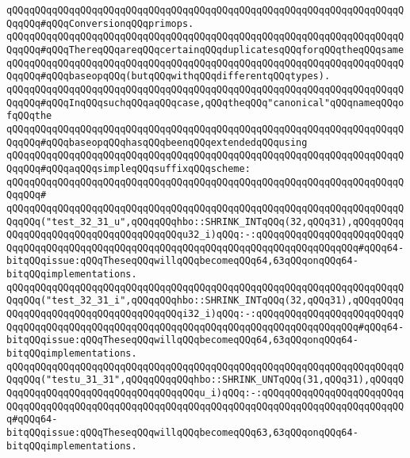 \newline
\verb|qQQqqQQqqQQqqQQqqQQqqQQqqQQqqQQqqQQqqQQqqQQqqQQqqQQqqQQqqQQqqQQqqQQqqQQqqQQq#qQQqConversionqQQqprimops.|\newline
\verb|qQQqqQQqqQQqqQQqqQQqqQQqqQQqqQQqqQQqqQQqqQQqqQQqqQQqqQQqqQQqqQQqqQQqqQQqqQQq#qQQqThereqQQqareqQQqcertainqQQqduplicatesqQQqforqQQqtheqQQqsame|\newline
\verb|qQQqqQQqqQQqqQQqqQQqqQQqqQQqqQQqqQQqqQQqqQQqqQQqqQQqqQQqqQQqqQQqqQQqqQQqqQQq#qQQqbaseopqQQq(butqQQqwithqQQqdifferentqQQqtypes).|\newline
\verb|qQQqqQQqqQQqqQQqqQQqqQQqqQQqqQQqqQQqqQQqqQQqqQQqqQQqqQQqqQQqqQQqqQQqqQQqqQQq#qQQqInqQQqsuchqQQqaqQQqcase,qQQqtheqQQq"canonical"qQQqnameqQQqofqQQqthe|\newline
\verb|qQQqqQQqqQQqqQQqqQQqqQQqqQQqqQQqqQQqqQQqqQQqqQQqqQQqqQQqqQQqqQQqqQQqqQQqqQQq#qQQqbaseopqQQqhasqQQqbeenqQQqextendedqQQqusing|\newline
\verb|qQQqqQQqqQQqqQQqqQQqqQQqqQQqqQQqqQQqqQQqqQQqqQQqqQQqqQQqqQQqqQQqqQQqqQQqqQQq#qQQqaqQQqsimpleqQQqsuffixqQQqscheme:|\newline
\verb|qQQqqQQqqQQqqQQqqQQqqQQqqQQqqQQqqQQqqQQqqQQqqQQqqQQqqQQqqQQqqQQqqQQqqQQqqQQq#|\newline
\verb|qQQqqQQqqQQqqQQqqQQqqQQqqQQqqQQqqQQqqQQqqQQqqQQqqQQqqQQqqQQqqQQqqQQqqQQqqQQq("test_32_31_u",qQQqqQQqhbo::SHRINK_INTqQQq(32,qQQq31),qQQqqQQqqQQqqQQqqQQqqQQqqQQqqQQqqQQqqQQqu32_i)qQQq:-:qQQqqQQqqQQqqQQqqQQqqQQqqQQqqQQqqQQqqQQqqQQqqQQqqQQqqQQqqQQqqQQqqQQqqQQqqQQqqQQqqQQqqQQq#qQQq64-bitqQQqissue:qQQqTheseqQQqwillqQQqbecomeqQQq64,63qQQqonqQQq64-bitqQQqimplementations.|\newline
\verb|qQQqqQQqqQQqqQQqqQQqqQQqqQQqqQQqqQQqqQQqqQQqqQQqqQQqqQQqqQQqqQQqqQQqqQQqqQQq("test_32_31_i",qQQqqQQqhbo::SHRINK_INTqQQq(32,qQQq31),qQQqqQQqqQQqqQQqqQQqqQQqqQQqqQQqqQQqqQQqi32_i)qQQq:-:qQQqqQQqqQQqqQQqqQQqqQQqqQQqqQQqqQQqqQQqqQQqqQQqqQQqqQQqqQQqqQQqqQQqqQQqqQQqqQQqqQQqqQQq#qQQq64-bitqQQqissue:qQQqTheseqQQqwillqQQqbecomeqQQq64,63qQQqonqQQq64-bitqQQqimplementations.|\newline
\newline
\verb|qQQqqQQqqQQqqQQqqQQqqQQqqQQqqQQqqQQqqQQqqQQqqQQqqQQqqQQqqQQqqQQqqQQqqQQqqQQq("testu_31_31",qQQqqQQqqQQqhbo::SHRINK_UNTqQQq(31,qQQq31),qQQqqQQqqQQqqQQqqQQqqQQqqQQqqQQqqQQqqQQqu_i)qQQq:-:qQQqqQQqqQQqqQQqqQQqqQQqqQQqqQQqqQQqqQQqqQQqqQQqqQQqqQQqqQQqqQQqqQQqqQQqqQQqqQQqqQQqqQQqqQQqqQQq#qQQq64-bitqQQqissue:qQQqTheseqQQqwillqQQqbecomeqQQq63,63qQQqonqQQq64-bitqQQqimplementations.|\newline
\newline
